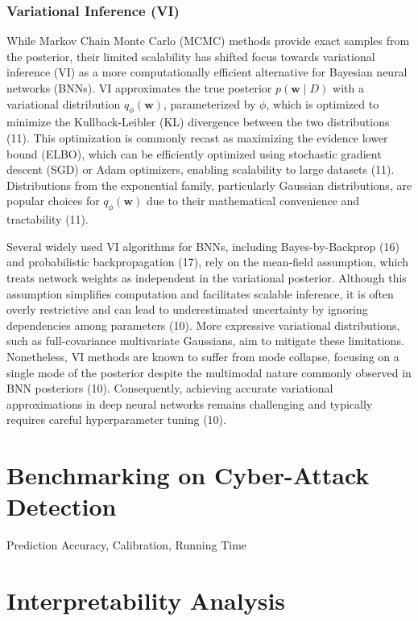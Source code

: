 \documentclass[
  a4paper,
]{scrreprt}
\begin{document}
\subsubsection{Variational Inference
(VI)}\label{variational-inference-vi}

While Markov Chain Monte Carlo (MCMC) methods provide exact samples from
the posterior, their limited scalability has shifted focus towards
variational inference (VI) as a more computationally efficient
alternative for Bayesian neural networks (BNNs). VI approximates the
true posterior \(p(\mathbf{w} \mid D)\) with a variational distribution
\(q_{\phi}(\mathbf{w})\), parameterized by \(\phi\), which is optimized
to minimize the Kullback-Leibler (KL) divergence between the two
distributions (11). This optimization is commonly recast as maximizing
the evidence lower bound (ELBO), which can be efficiently optimized
using stochastic gradient descent (SGD) or Adam optimizers, enabling
scalability to large datasets (11). Distributions from the exponential
family, particularly Gaussian distributions, are popular choices for
\(q_{\phi}(\mathbf{w})\) due to their mathematical convenience and
tractability (11).

Several widely used VI algorithms for BNNs, including Bayes-by-Backprop
(16) and probabilistic backpropagation (17), rely on the mean-field
assumption, which treats network weights as independent in the
variational posterior. Although this assumption simplifies computation
and facilitates scalable inference, it is often overly restrictive and
can lead to underestimated uncertainty by ignoring dependencies among
parameters (10). More expressive variational distributions, such as
full-covariance multivariate Gaussians, aim to mitigate these
limitations. Nonetheless, VI methods are known to suffer from mode
collapse, focusing on a single mode of the posterior despite the
multimodal nature commonly observed in BNN posteriors (10).
Consequently, achieving accurate variational approximations in deep
neural networks remains challenging and typically requires careful
hyperparameter tuning (10).

\section{Benchmarking on Cyber-Attack
Detection}\label{benchmarking-on-cyber-attack-detection}

Prediction Accuracy, Calibration, Running Time

\section{Interpretability Analysis}\label{interpretability-analysis}
\end{document}
